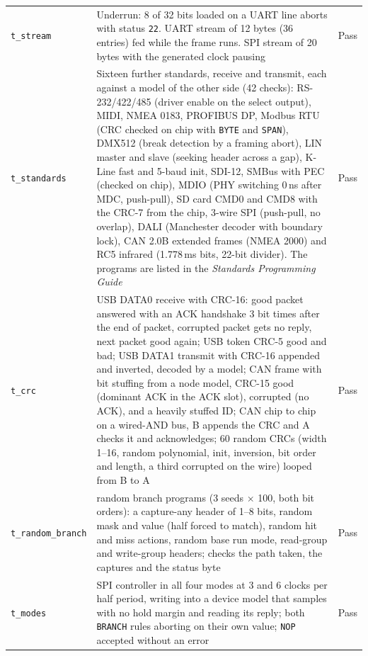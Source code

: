 \documentclass[11pt,a4paper]{article}
\newcommand{\sig}[1]{\texttt{#1}}
\begin{document}
\begin{longtable}{@{}>{\raggedright\arraybackslash}p{2.6cm} >{\raggedright\arraybackslash}p{12.2cm} l@{}}
\sig{t\_stream} & Underrun: 8 of 32 bits loaded on a UART line aborts with status \texttt{22}. UART stream of 12 bytes (36 entries) fed while the frame runs. SPI stream of 20 bytes with the generated clock pausing & Pass \\
\sig{t\_standards} & Sixteen further standards, receive and transmit, each against a model of the other side (42 checks): RS-232/422/485 (driver enable on the select output), MIDI, NMEA 0183, PROFIBUS DP, Modbus RTU (CRC checked on chip with \sig{BYTE} and \sig{SPAN}), DMX512 (break detection by a framing abort), LIN master and slave (seeking header across a gap), K-Line fast and 5-baud init, SDI-12, SMBus with PEC (checked on chip), MDIO (PHY switching 0\,ns after MDC, push-pull), SD card CMD0 and CMD8 with the CRC-7 from the chip, 3-wire SPI (push-pull, no overlap), DALI (Manchester decoder with boundary lock), CAN 2.0B extended frames (NMEA 2000) and RC5 infrared (1.778\,ms bits, 22-bit divider). The programs are listed in the \emph{Standards Programming Guide} & Pass \\
\sig{t\_crc} & USB DATA0 receive with CRC-16: good packet answered with an ACK handshake 3 bit times after the end of packet, corrupted packet gets no reply, next packet good again; USB token CRC-5 good and bad; USB DATA1 transmit with CRC-16 appended and inverted, decoded by a model; CAN frame with bit stuffing from a node model, CRC-15 good (dominant ACK in the ACK slot), corrupted (no ACK), and a heavily stuffed ID; CAN chip to chip on a wired-AND bus, B appends the CRC and A checks it and acknowledges; 60 random CRCs (width 1--16, random polynomial, init, inversion, bit order and length, a third corrupted on the wire) looped from B to A & Pass \\
\sig{t\_random\_\allowbreak branch} & 600 random branch programs (3 seeds $\times$ 100, both bit orders): a capture-any header of 1--8 bits, random mask and value (half forced to match), random hit and miss actions, random base run mode, read-group and write-group headers; checks the path taken, the captures and the status byte & Pass \\
\sig{t\_modes} & SPI controller in all four modes at 3 and 6 clocks per half period, writing into a device model that samples with no hold margin and reading its reply; both \sig{BRANCH} rules aborting on their own value; \sig{NOP} accepted without an error & Pass \\
\bottomrule
\end{longtable}
\end{document}

